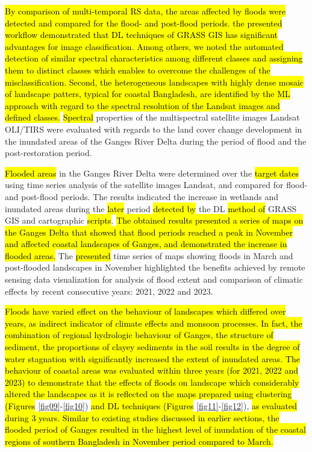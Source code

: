 \documentclass[water,article,submit,pdftex,moreauthors]{Definitions/mdpi}
\begin{document}
\hl{By comparison of multi-temporal RS data, the areas affected by floods were detected and compared for the flood- and post-flood periods. the presented workflow demonstrated that DL techniques of GRASS GIS  has significant advantages for image classification. Among others, we noted the automated detection of similar spectral characteristics among different classes and assigning them to distinct classes which enables to overcome the challenges of the misclassification. Second, the heterogeneous landscapes with highly dense mosaic of landscape patters, typical for coastal Bangladesh, are identified by the ML approach with regard to the spectral resolution of the Landsat images and defined classes.} \hl{Spectral} properties of the multispectral satellite images Landsat OLI/TIRS  were evaluated with regards to the land cover change development in the inundated areas of the Ganges River Delta during the period of flood and the post-restoration period. 

\hl{Flooded areas} in the Ganges River Delta were determined over the \hl{target dates} using time series analysis of the satellite images Landsat, and compared for flood- and post-flood periods. The results indicated the increase in wetlands and inundated areas during the \hl{later} period \hl{detected by} the DL \hl{method of }GRASS GIS and\hl{ }cartographic \hl{scripts}. \hl{The obtained results presented a series of maps on the Ganges Delta that showed that flood periods reached a peak in November and affected coastal landscapes of Ganges, and demonstrated the increase in flooded areas.} The \hl{presented} time series of maps showing floods in March and post-flooded landscapes in November highlighted the benefits achieved by remote sensing data visualization for analysis of flood extent and comparison of climatic effects by recent consecutive years: 2021, 2022 and 2023. 

\hl{Floods have varied effect on the behaviour of landscapes which differed over years, as indirect indicator of climate effects and monsoon processes. In fact, the combination of regional hydrologic behaviour of Ganges, the structure of sediment, the proportions of clayey sediments in the soil results in the degree of water stagnation with significantly increased the extent of inundated areas. The behaviour of coastal areas was evaluated within three years (for 2021, 2022 and 2023) to demonstrate that the effects of floods on landscape which considerably altered the landscapes as it is reflected on the maps prepared using clustering (Figures} \ref{fig09}-\ref{fig10}) \hl{and DL techniques (Figures} \ref{fig11}-\ref{fig12}), \hl{as evaluated during 3 years. Similar to existing studies discussed in earlier sections, the flooded period of Ganges resulted in the highest level of inundation of the coastal regions of southern Bangladesh in November period compared to March. }
\end{document}
